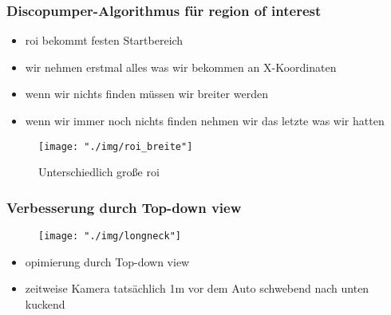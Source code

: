 \documentclass{beamer}
\begin{document}
\begin{frame}

\frametitle{Discopumper-Algorithmus für region of interest}

\begin{itemize}
\item roi bekommt festen Startbereich
\item wir nehmen erstmal alles was wir bekommen an X-Koordinaten
\item wenn wir nichts finden müssen wir breiter werden
\item wenn wir immer noch nichts finden nehmen wir das letzte was wir hatten
\end{itemize}

\begin{center}
\begin{figure}[h]
\centering
\texttt{[image: "./img/roi\_breite"]}
\label{fig:roi}
\caption{Unterschiedlich große roi}
\end{figure}
\end{center}


\end{frame}

\begin{frame}
\frametitle{Verbesserung durch Top-down view}

\begin{center}
\begin{figure}[h]
\centering
\texttt{[image: "./img/longneck"]}
\label{fig:roi}
\end{figure}
\end{center}

\begin{itemize}
\item opimierung durch Top-down view
\item zeitweise Kamera tatsächlich 1m vor dem Auto schwebend nach unten kuckend
\end{itemize}
\end{frame}
\end{document}

